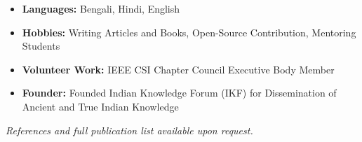 \documentclass[10pt,a4paper]{article}
\begin{document}
	\begin{itemize}[leftmargin=0.15in]
		\item \textbf{Languages:} Bengali, Hindi, English
		\item \textbf{Hobbies:} Writing Articles and Books, Open-Source Contribution, Mentoring Students
		\item \textbf{Volunteer Work:} IEEE CSI Chapter Council Executive Body Member
		\item \textbf{Founder:} Founded Indian Knowledge Forum (IKF) for Dissemination of Ancient and True Indian Knowledge
	\end{itemize}
	
	\vfill
	
	\begin{center}
		\textit{References and full publication list available upon request.}
	\end{center}
	
\end{document}
